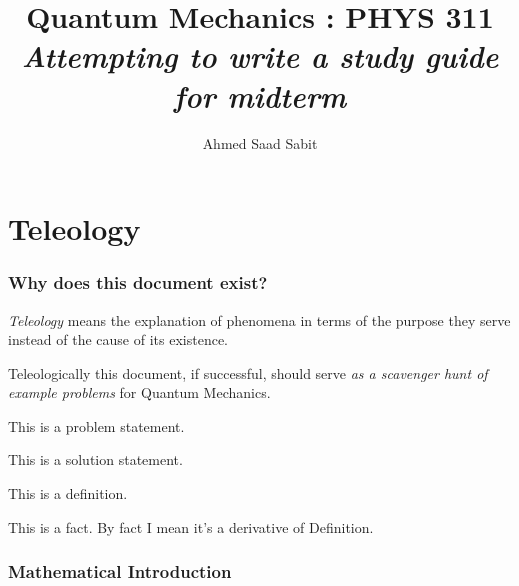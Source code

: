 \documentclass[10pt]{article}
\begin{document}
	\title{{Quantum Mechanics : PHYS 311}\\{\normalsize{\itshape 
Attempting to write a study guide for midterm
	}}}
	\author{Ahmed Saad Sabit}
	\maketitle
	\newpage
	\pagestyle{fancynotes}

\part{Teleology}
\section*{Why does this document exist?} 
\emph{Teleology} means the explanation of phenomena in terms of the purpose they serve instead of the cause of its existence.

Teleologically this document, if successful, should serve \emph{as a scavenger hunt of example problems} for Quantum Mechanics.


\begin{prob}
	This is a problem statement.
\end{prob}
\begin{solu}
	This is a solution statement. 
\end{solu}
\begin{definition}
	This is a definition. 
\end{definition}
\begin{fact}
This is a fact. By fact I mean it's a derivative of Definition.
\end{fact}





























\newpage
\section{Mathematical Introduction}
\end{document}
